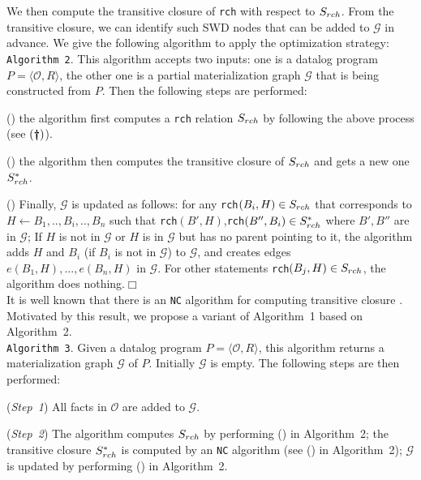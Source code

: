 \documentclass{article}
\begin{document}
We then compute the transitive closure of \texttt{rch} with respect to $S_{\tiny rch}$. From the transitive closure, we can identify such SWD nodes that can be added to $\mathcal{G}$ in advance. We give the following algorithm to apply the optimization strategy:\\

\noindent\texttt{Algorithm~2}. This algorithm accepts two inputs: one is a datalog program $P=\langle\mathcal{O}, R\rangle$, the other one is a partial materialization graph $\mathcal{G}$ that is being constructed from $P$. Then the following steps are performed:

(\textbf{}) the algorithm first computes a \texttt{rch} relation $S_{\tiny rch}$ by following the above process (see $(\textbf{\dag})$).

(\textbf{}) the algorithm then computes the transitive closure of $S_{\tiny rch}$ and gets a new one $S^*_{\tiny rch}$.

(\textbf{}) Finally, $\mathcal{G}$ is updated as follows: for any \texttt{rch}$(B_i,H)\in S_{\tiny rch}$ that corresponds to $H\leftarrow B_1,..,B_i,..,B_n$
such that \texttt{rch}$(B',H)$,\texttt{rch}$(B'',B_i)\in S^*_{\tiny rch}$ where $B',B''$ are in $\mathcal{G}$; If $H$ is not in $\mathcal{G}$ or $H$ is in $\mathcal{G}$ but has no parent pointing to it, the algorithm adds $H$ and $B_i$ (if $B_i$ is not in $\mathcal{G}$) to $\mathcal{G}$, and creates edges $e(B_1, H),...,e(B_n, H)$ in $\mathcal{G}$. For other statements \texttt{rch}$(B_j,H)\in S_{\tiny rch}$, the algorithm does nothing.\hfill$\Box$\\

It is well known that there is an \texttt{NC} algorithm for computing transitive closure \cite{DBLP:conf/cie/Allender07}.
Motivated by this result, we propose a variant of Algorithm~1 based on Algorithm~2.\\

\noindent\texttt{Algorithm~3}. Given a datalog program $P=\langle\mathcal{O}, R\rangle$, this algorithm
returns a materialization graph $\mathcal{G}$ of $P$. Initially $\mathcal{G}$ is empty. The following steps are then performed:

(\emph{Step~1}) All facts in $\mathcal{O}$ are added to $\mathcal{G}$.

(\emph{Step~2}) The algorithm computes $S_{\tiny rch}$ by performing (\textbf{}) in Algorithm~2; the transitive closure $S^*_{\tiny rch}$ is computed by an \texttt{NC} algorithm (see (\textbf{}) in Algorithm~2); $\mathcal{G}$ is updated by performing (\textbf{}) in Algorithm~2.
\end{document}
